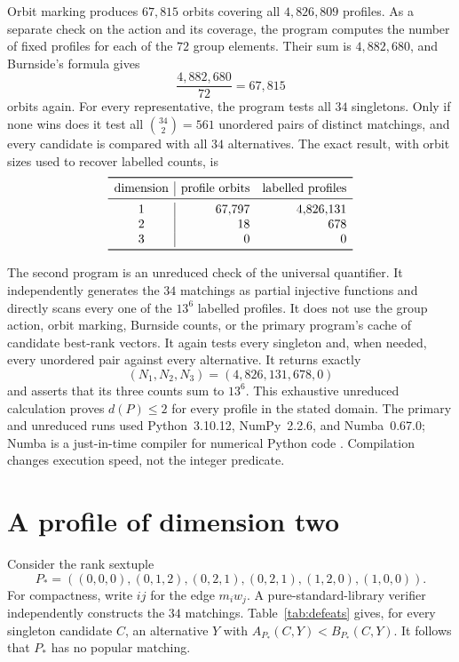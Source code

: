 \documentclass[11pt]{article}
\begin{document}
Orbit marking produces $67{,}815$ orbits covering all $4{,}826{,}809$
profiles.  As a separate check on the action and its coverage, the program
computes the number of fixed profiles for each of the $72$ group elements.
Their sum is $4{,}882{,}680$, and Burnside's formula gives
\[
 \frac{4{,}882{,}680}{72}=67{,}815
\]
orbits again.  For every representative, the program tests all $34$
singletons.  Only if none wins does it test all
$\binom{34}{2}=561$ unordered pairs of distinct matchings, and every candidate
is compared with all $34$ alternatives.  The exact result, with orbit sizes
used to recover labelled counts, is
\[
\begin{array}{c|rr}
\toprule
\text{dimension}&\text{profile orbits}&\text{labelled profiles}\\
\midrule
1&67{,}797&4{,}826{,}131\\
2&18&678\\
3&0&0\\
\bottomrule
\end{array}
\]

The second program is an unreduced check of the universal quantifier.  It
independently generates the $34$ matchings as partial injective functions and
directly scans every one of the $13^6$ labelled profiles.  It does not use the
group action, orbit marking, Burnside counts, or the primary program's cache of
candidate best-rank vectors.  It again tests every singleton and, when needed,
every unordered pair against every alternative.  It returns exactly
\[
 (N_1,N_2,N_3)=(4{,}826{,}131,678,0)
\]
and asserts that its three counts sum to $13^6$.  This exhaustive unreduced
calculation proves $d(P)\leq2$ for every profile in the stated domain.  The
primary and unreduced runs used Python~3.10.12, NumPy~2.2.6, and Numba~0.67.0;
Numba is a just-in-time compiler for numerical Python code
\cite{LamPitrouSeibert2015}.  Compilation changes execution speed, not the
integer predicate.

\section{A profile of dimension two}

Consider the rank sextuple
\begin{equation}\label{eq:witness}
 P_*=((0,0,0),(0,1,2),(0,2,1),(0,2,1),(1,2,0),(1,0,0)).
\end{equation}
For compactness, write $ij$ for the edge $m_iw_j$.  A pure-standard-library
verifier independently constructs the $34$ matchings.  Table~\ref{tab:defeats}
gives, for every singleton candidate $C$, an alternative $Y$ with
$A_{P_*}(C,Y)<B_{P_*}(C,Y)$.  It follows that $P_*$ has no popular matching.
\end{document}
